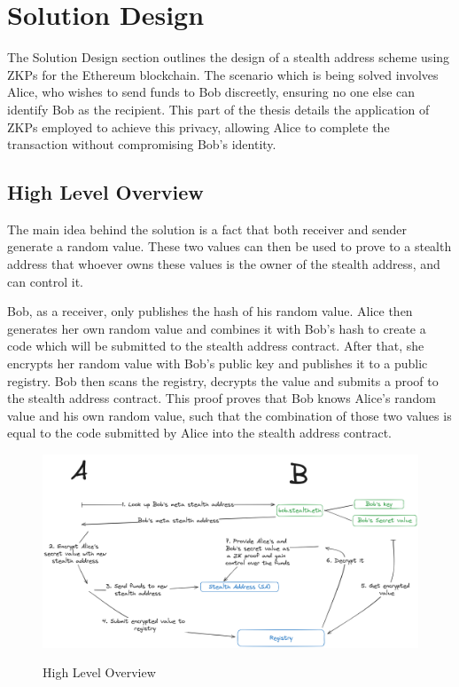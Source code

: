 \chapter{Solution Design}

The Solution Design section outlines the design of a stealth address
scheme using ZKPs for the Ethereum blockchain. The scenario which is being
solved involves Alice, who wishes to send funds to Bob discreetly, ensuring no
one else can identify Bob as the recipient. This part of the thesis details
the application of ZKPs employed to achieve this privacy, allowing Alice to
complete the transaction without compromising Bob's identity.

\section{High Level Overview}

The main idea behind the solution is a fact that both
receiver and sender generate a random value. These two values can then
be used to prove to a stealth address that whoever owns these values
is the owner of the stealth address, and can control it.

Bob, as a receiver, only publishes the hash of his random value. Alice then
generates her own random value and combines it with Bob's hash to create a
code which will be submitted to the stealth address contract. After that,
she encrypts her random value with Bob's public key and publishes it to a
public registry. Bob then scans the registry, decrypts the value and
submits a proof to the stealth address contract. This proof proves that
Bob knows Alice's random value and his own random value, such that the combination
of those two values is equal to the code submitted by Alice into the stealth
address contract.

\begin{figure}[h]
    \centering
    \includegraphics[scale=0.20]{assets/images/high-level.png}
    \caption{High Level Overview}
    \label{fig:hig-level}
	\cite{ButerinIncompleteGuide}
    \vspace{0.5cm}
\end{figure}

